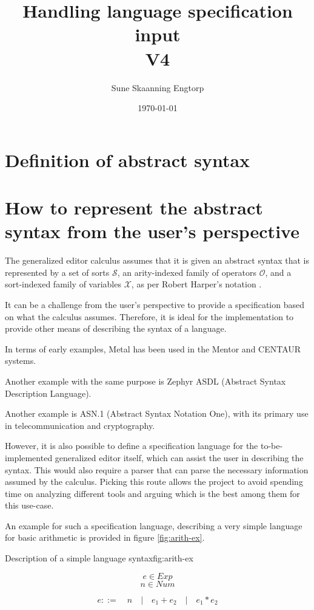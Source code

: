 \documentclass{article}
\title{Handling language specification input \\ V4}
\date{\today}
\author{Sune Skaanning Engtorp}
\begin{document}
\maketitle

\section{Definition of abstract syntax}


\section{How to represent the abstract syntax from the user's perspective}

The generalized editor calculus\cite{aalborg} assumes that it is given an abstract syntax that is represented by a set of sorts $\mathcal{S}$, an arity-indexed family of operators $\mathcal{O}$, and a sort-indexed family of variables $\mathcal{X}$, as per Robert Harper's notation \cite{practical-foundations-for-prog-lang}.

It can be a challenge from the user's perspective to provide a specification based on what the calculus assumes. Therefore, it is ideal for the implementation to provide other means of describing the syntax of a language.

In terms of early examples, Metal\cite{metal} has been used in the Mentor \cite{mentor-applications} and CENTAUR \cite{centaur} systems.

Another example with the same purpose is Zephyr ASDL (Abstract Syntax Description Language)\cite{zephyr}.

Another example is ASN.1 (Abstract Syntax Notation One)\cite{asn1}, with its primary use in telecommunication and cryptography.

However, it is also possible to define a specification language for the to-be-implemented generalized editor itself, which can assist the user in describing the syntax. This would also require a parser that can parse the necessary information assumed by the calculus. Picking this route allows the project to avoid spending time on analyzing different tools and arguing which is the best among them for this use-case.

An example for such a specification language, describing a very simple language for basic arithmetic is provided in figure \ref{fig:arith-ex}.

\begin{center}
\begin{myfigure}{Description of a simple language syntax}{fig:arith-ex}
\begin{varwidth}{\textwidth}
\[ e \in Exp \]
\[ n \in Num \]

\[ e ::= \quad n \quad | \quad e_1 + e_2 \quad | \quad e_1 * e_2 \]
\end{varwidth}
\end{myfigure}
\end{center}
\end{document}
